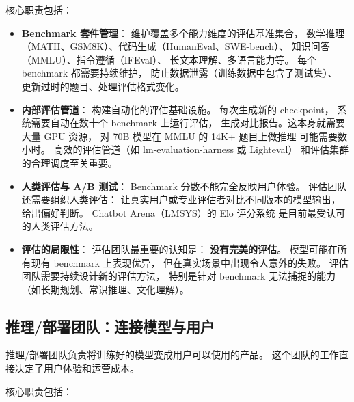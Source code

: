 核心职责包括：

\begin{itemize}[noitemsep]
  \item \textbf{Benchmark 套件管理}：
        维护覆盖多个能力维度的评估基准集合，
        数学推理（MATH、GSM8K）、代码生成（HumanEval、SWE-bench）、
        知识问答（MMLU）、指令遵循（IFEval）、
        长文本理解、多语言能力等。
        每个 benchmark 都需要持续维护，
        防止数据泄露（训练数据中包含了测试集）、
        更新过时的题目、处理评估格式变化。
  \item \textbf{内部评估管道}：
        构建自动化的评估基础设施。
        每次生成新的 checkpoint，
        系统需要自动在数十个 benchmark 上运行评估，
        生成对比报告。这本身就需要大量 GPU 资源，
        对 70B 模型在 MMLU 的 14K+ 题目上做推理
        可能需要数小时。
        高效的评估管道（如 lm-evaluation-harness 或 Lighteval）
        和评估集群的合理调度至关重要。
  \item \textbf{人类评估与 A/B 测试}：
        Benchmark 分数不能完全反映用户体验。
        评估团队还需要组织人类评估：
        让真实用户或专业评估者对比不同版本的模型输出，
        给出偏好判断。
        Chatbot Arena（LMSYS）的 Elo 评分系统
        是目前最受认可的人类评估方法。
  \item \textbf{评估的局限性}：
        评估团队最重要的认知是：
        \textbf{没有完美的评估}。
        模型可能在所有现有 benchmark 上表现优异，
        但在真实场景中出现令人意外的失败。
        评估团队需要持续设计新的评估方法，
        特别是针对 benchmark 无法捕捉的能力
        （如长期规划、常识推理、文化理解）。
\end{itemize}

\subsection{推理/部署团队：连接模型与用户}

推理/部署团队负责将训练好的模型变成用户可以使用的产品。
这个团队的工作直接决定了用户体验和运营成本。

核心职责包括：

